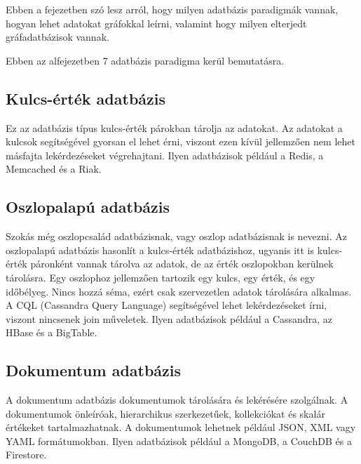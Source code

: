 
Ebben a fejezetben szó lesz arról, hogy milyen adatbázis paradigmák vannak, hogyan lehet adatokat gráfokkal leírni,  valamint hogy milyen elterjedt gráfadatbázisok vannak.




Ebben az alfejezetben 7 adatbázis paradigma kerül bemutatásra. \cite{paradigms} \cite{nosql1} \cite{nosql2} \cite{nosql3}

\subsection{Kulcs-érték adatbázis}

Ez az adatbázis típus kulcs-érték párokban tárolja az adatokat.  Az adatokat a kulcsok segítségével gyorsan el lehet érni, viszont ezen kívül jellemzően nem lehet másfajta lekérdezéseket végrehajtani. Ilyen adatbázisok például a Redis, a Memcached és a Riak.

\subsection{Oszlopalapú adatbázis}
Szokás még oszlopcsalád adatbázisnak, vagy oszlop adatbázisnak is nevezni. Az oszlopalapú adatbázis hasonlít a kulcs-érték adatbázishoz, ugyanis itt is kulcs-érték páronként vannak tárolva az adatok, de az érték oszlopokban kerülnek tárolásra. Egy oszlophoz jellemzően tartozik egy kulcs, egy érték, és egy időbélyeg. Nincs hozzá séma, ezért csak szervezetlen adatok tárolására alkalmas. A CQL (Cassandra Query Language) segítségével lehet lekérdezéseket írni, viszont nincsenek join műveletek. Ilyen adatbázisok például a Cassandra, az HBase és a BigTable.

\subsection{Dokumentum adatbázis}
A dokumentum adatbázis dokumentumok tárolására és lekérésére szolgálnak. A dokumentumok önleíróak, hierarchikus szerkezetűek, kollekciókat és skalár értékeket tartalmazhatnak. A dokumentumok lehetnek például JSON, XML vagy YAML formátumokban. Ilyen adatbázisok például a MongoDB, a CouchDB és a Firestore.

